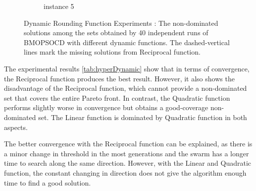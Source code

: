 \documentclass[10pt,journal,compsoc]{IEEEtran}
\begin{document}
\begin{figure}[h!]
\begin{subfigure}{0.49\linewidth}
    \caption{instance 5}
   \end{subfigure}
   \caption{Dynamic Rounding Function Experiments : The non-dominated solutions among the sets obtained by 40 independent runs of BMOPSOCD with different dynamic functions. The dashed-vertical lines mark the missing solutions from Reciprocal function.}
   \label{fig:dynamicFunctions}
\end{figure}


\begin{table}[H]
\centering
\footnotesize
{}
\caption{The mean and standard deviation of the HyperVolume values over the 40 independent runs}
\label{tab:hyperDynamic}

\end{table}

The experimental results \ref{tab:hyperDynamic} show that in terms of convergence, the Reciprocal function produces the best result. 
However, it also shows the disadvantage of the Reciprocal function, which cannot provide a non-dominated set that covers the entire Pareto front. 
In contrast, the Quadratic function performs
slightly worse in convergence but obtains a good-coverage non-dominated set. The Linear function is dominated by Quadratic function in both aspects.

The better convergence with the Reciprocal function can be explained, as there is a minor change in threshold in the most generations and the swarm has a longer time to search along the same direction. However, with the Linear and Quadratic function, the constant changing in direction does not give the algorithm enough time to find a good solution.
\end{document}

